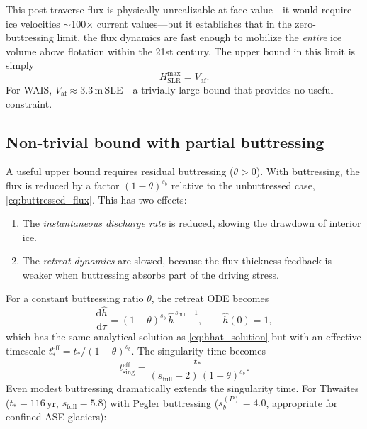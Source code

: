 \documentclass[11pt]{article}
\newcommand{\dd}{\mathrm{d}}
\newcommand{\hhat}{\hat{h}}
\newcommand{\Vaf}{V_{\mathrm{af}}}
\begin{document}
This post-traverse flux is physically unrealizable at face value---it would require ice velocities $\sim$100$\times$ current values---but it establishes that in the zero-buttressing limit, the flux dynamics are fast enough to mobilize the \emph{entire} ice volume above flotation within the 21st century. The upper bound in this limit is simply
\begin{equation}
	H_{\mathrm{SLR}}^{\mathrm{max}} = \Vaf.
	\label{eq:Vaf_ceiling}
\end{equation}
For WAIS, $\Vaf \approx 3.3$\,m\,SLE---a trivially large bound that provides no useful constraint.

\subsection{Non-trivial bound with partial buttressing}

A useful upper bound requires residual buttressing ($\theta > 0$). With buttressing, the flux is reduced by a factor $(1 - \theta)^{s_b}$ relative to the unbuttressed case, \eqref{eq:buttressed_flux}. This has two effects:
\begin{enumerate}
	\item The \emph{instantaneous discharge rate} is reduced, slowing the drawdown of interior ice.
	\item The \emph{retreat dynamics} are slowed, because the flux-thickness feedback is weaker when buttressing absorbs part of the driving stress.
\end{enumerate}

For a constant buttressing ratio $\theta$, the retreat ODE becomes
\begin{equation}
	\frac{\dd\hhat}{\dd\tau} = (1-\theta)^{s_b}\,\hhat^{\,s_{\mathrm{full}}-1},
	\qquad \hhat(0) = 1,
	\label{eq:hhat_buttressed}
\end{equation}
which has the same analytical solution as \eqref{eq:hhat_solution} but with an effective timescale $t_*^{\mathrm{eff}} = t_*/(1-\theta)^{s_b}$. The singularity time becomes
\begin{equation}
	t_{\mathrm{sing}}^{\mathrm{eff}} = \frac{t_*}{(s_{\mathrm{full}} - 2)\,(1-\theta)^{s_b}}.
	\label{eq:tsing_buttressed}
\end{equation}
Even modest buttressing dramatically extends the singularity time. For Thwaites ($t_* = 116$\,yr, $s_{\mathrm{full}} = 5.8$) with Pegler buttressing ($s_b^{(P)} = 4.0$, appropriate for confined ASE glaciers):
\end{document}
